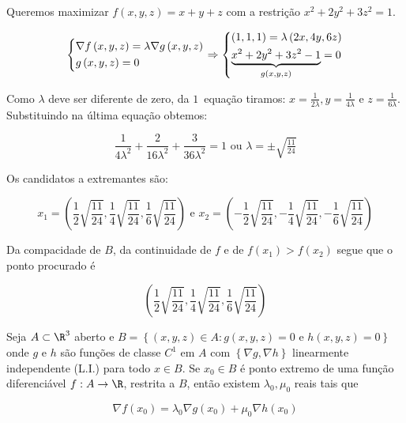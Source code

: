 \documentclass{book}
\begin{document}
\begin{sol}
    Queremos maximizar $f\left( {x,y,z} \right) = x + y + z$ com a restri\c c\~ao $x^2  + 2y^2  + 3z^2  = 1$.

\[
\left\{ \begin{gathered}
  \nabla f\left( {x,y,z} \right) = \lambda \nabla g\left( {x,y,z} \right) \hfill \\
g\left( {x,y,z} \right) = 0 \hfill \\
\end{gathered}  \right. \Rightarrow \left\{ \begin{gathered}
\left( {1,1,1} \right) = \lambda \left( {2x,4y,6z} \right) \hfill \\
\underbrace {x^2  + 2y^2  + 3z^2  - 1}_{g\left( {x,y,z} \right)} = 0 \hfill \\
\end{gathered}  \right.
\]

    Como $\lambda$ deve ser diferente de zero, da $1$\textordfeminine\ equa\c c\~ao tiramos: $x = \frac{1}{{2\lambda }},y = \frac{1}{{4\lambda }}$ e $z = \frac{1}{{6\lambda }}$. Substituindo na \'ultima equa\c c\~ao obtemos:

\[
    \frac{1}{{4\lambda ^2 }} + \frac{2}{{16\lambda ^2 }} + \frac{3}{{36\lambda ^2 }} = 1{\text{ ou }}\lambda  =  \pm \sqrt {\tfrac{{11}}{{24}}}
\]

Os candidatos a extremantes s\~ao:

\[
x_1  = \left( {\frac{1}
{2}\sqrt {\frac{{11}}
{{24}}} ,\frac{1}
{4}\sqrt {\frac{{11}}
{{24}}} ,\frac{1}
{6}\sqrt {\frac{{11}}
{{24}}} } \right){\text{ e }}x_2  = \left( { - \frac{1}
{2}\sqrt {\frac{{11}}
{{24}}} , - \frac{1}
{4}\sqrt {\frac{{11}}
{{24}}} , - \frac{1}
{6}\sqrt {\frac{{11}}
{{24}}} } \right)
\]

    Da compacidade de $B$, da continuidade de $f$ e de $f\left( {x_1 } \right) > f\left( {x_2 } \right)$ segue que o ponto procurado \'e

\[
\left( {\frac{1}
{2}\sqrt {\frac{{11}}
{{24}}} ,\frac{1}
{4}\sqrt {\frac{{11}}
{{24}}} ,\frac{1}
{6}\sqrt {\frac{{11}}
{{24}}} } \right)
\]

\end{sol}

\begin{teo}
    Seja $A \subset \R^3$ aberto e $B = \left\{ {\left( {x,y,z} \right) \in A:g\left( {x,y,z} \right) = 0{\text{ e }}h\left( {x,y,z} \right) = 0} \right\}$ onde $g$ e $h$ s\~ao fun\c c\~oes de classe $C^1$ em $A$ com $\left\{ {\nabla g,\nabla h} \right\}$ linearmente independente (L.I.) para todo $x \in B$. Se $x_0 \in B$ \'e ponto extremo de uma fun\c c\~ao diferenci\'avel $f:A \to \R$, restrita a $B$, ent\~ao existem $\lambda _0 ,\mu _0$ reais tais que

\[
    \nabla f\left( {x_0 } \right) = \lambda _0 \nabla g\left( {x_0 } \right) + \mu _0 \nabla h\left( {x_0 } \right)
\]

\end{teo}
\end{document}
